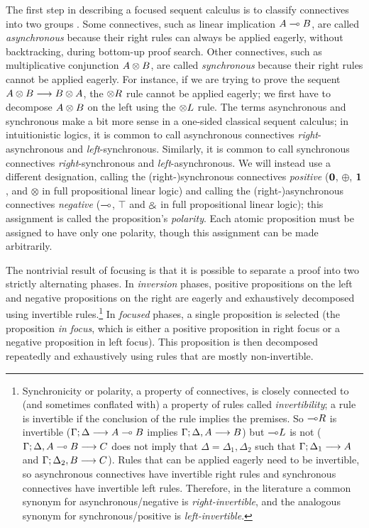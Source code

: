 The first step in describing a focused sequent calculus is to classify
connectives into two groups \cite{andreoli92logic}.  Some connectives,
such as linear implication $A \multimap B$, are called {\it asynchronous}
because their right rules can always be applied eagerly, without
backtracking, during bottom-up proof search. Other connectives, such
as multiplicative conjunction $A \otimes B$, are called {\it
  synchronous} because their right rules cannot be applied
eagerly. For instance, if we are trying to prove the sequent $A
\otimes B \longrightarrow B \otimes A$, the ${\otimes}R$ rule cannot
be applied eagerly; we first have to decompose $A \otimes B$ on the
left using the ${\otimes}L$ rule.  The terms asynchronous and
synchronous make a bit more sense in a one-sided classical sequent
calculus; in intuitionistic logics, it is common to call asynchronous
connectives {\it right}-asynchronous and {\it
  left}-synchronous. Similarly, it is common to call synchronous
connectives {\it right}-synchronous and {\it left}-asynchronous.  We
will instead use a different designation, calling the
(right-)synchronous connectives {\it positive} ($\mathbf{0}$, $\oplus$,
$\mathbf{1}$, and $\otimes$ in full propositional linear logic) and calling
the (right-)asynchronous connectives {\it negative} ($\multimap$, $\top$
and $\mathbin{\binampersand}$ in full propositional linear logic); this assignment is
called the proposition's {\it polarity}. Each atomic proposition must
be assigned to have only one polarity, though this assignment can be
made arbitrarily.

The nontrivial result of focusing is that it is possible to separate a
proof into two strictly alternating phases. In {\it inversion} phases,
positive propositions on the left and negative propositions on the
right are eagerly and exhaustively decomposed using invertible
rules.\footnote{Synchronicity or polarity, a property of connectives,
  is closely connected to (and sometimes conflated with) a property of
  rules called {\it invertibility}; a rule is invertible if the
  conclusion of the rule implies the premises. So ${\multimap}R$ is
  invertible (${\Gamma};{\Delta} \longrightarrow {A \multimap B} \mathstrut$ implies
  ${\Gamma};{\Delta, A} \longrightarrow {B} \mathstrut$) but ${\multimap}L$ is not
  (${\Gamma};{\Delta, A \multimap B} \longrightarrow {C} \mathstrut$ does not imply that $\Delta =
  \Delta_1, \Delta_2$ such that ${\Gamma};{\Delta_1} \longrightarrow {A} \mathstrut$ and
  ${\Gamma};{\Delta_2, B} \longrightarrow {C} \mathstrut$).  Rules that can be applied eagerly
  need to be invertible, so asynchronous connectives have invertible
  right rules and synchronous connectives have invertible left
  rules. Therefore, in the literature a common synonym for
  asynchronous/negative is {\it right-invertible}, and the analogous
  synonym for synchronous/positive is {\it left-invertible}.}  In {\it
  focused} phases, a single proposition is selected (the proposition
{\it in focus}, which is either a positive proposition in right focus
or a negative proposition in left focus). This
proposition is then decomposed repeatedly and
exhaustively using rules that are mostly non-invertible.

